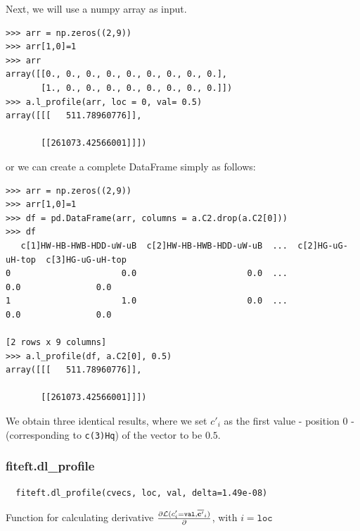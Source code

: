 \documentclass[12pt]{article}
\def\b#1{\boldsymbol{\rm #1}}
\begin{document}
Next, we will use a numpy array as input.
\begin{verbatim}
>>> arr = np.zeros((2,9))
>>> arr[1,0]=1
>>> arr
array([[0., 0., 0., 0., 0., 0., 0., 0., 0.],
       [1., 0., 0., 0., 0., 0., 0., 0., 0.]])
>>> a.l_profile(arr, loc = 0, val= 0.5)
array([[[   511.78960776]],

       [[261073.42566001]]])
\end{verbatim}
or we can create a complete DataFrame simply as follows:
\begin{verbatim}
>>> arr = np.zeros((2,9))
>>> arr[1,0]=1
>>> df = pd.DataFrame(arr, columns = a.C2.drop(a.C2[0]))
>>> df
   c[1]HW-HB-HWB-HDD-uW-uB  c[2]HW-HB-HWB-HDD-uW-uB  ...  c[2]HG-uG-uH-top  c[3]HG-uG-uH-top
0                      0.0                      0.0  ...               0.0               0.0
1                      1.0                      0.0  ...               0.0               0.0

[2 rows x 9 columns]
>>> a.l_profile(df, a.C2[0], 0.5)
array([[[   511.78960776]],

       [[261073.42566001]]])
\end{verbatim}
We obtain three identical results, where we set $c'_i$ as the first value - position 0 - (corresponding to \verb|c(3)Hq|) of the vector to be $0.5$.




\subsubsection{fiteft.dl\_profile}
\begin{verbatim}
  fiteft.dl_profile(cvecs, loc, val, delta=1.49e-08)
  \end{verbatim}
Function for calculating derivative $\frac{\partial \mathcal{L}(c'_i=\texttt{val},\overline{\b{c}'}_i)}{\partial } $, with $i=\texttt{loc}$
\end{document}
